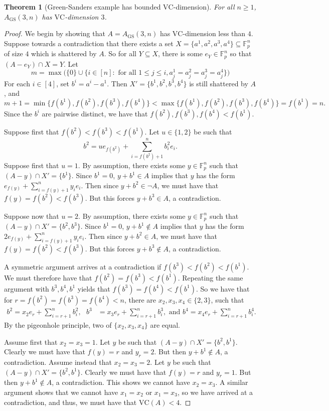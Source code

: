\documentclass[12pt,oneside,british,a4wide]{amsart}
\newtheorem{theorem}{Theorem}[section]
\numberwithin{equation}{section}
\theoremstyle{definition}
\def\F{\mathbb{F}}
\def\VC{\mathrm{VC}}
\def\GS{\mathrm{GS}}
\begin{document}
\begin{theorem}[Green-Sanders example has bounded $\VC$-dimension]\label{thm:gs3nip}
For all $n\geq 1$, $A_{\GS}(3,n)$ has $\VC$-dimension $3$.
\end{theorem}
\begin{proof}
We begin by showing that $A=A_{\GS}(3,n)$ has $\VC$-dimension less than $4$.  Suppose towards a contradiction that there exists a set $X=\{a^1,a^2,a^3,a^4\}\subseteq \F_p^n$ of size $4$ which is shattered by $A$.  So for all $Y\subseteq X$, there is some $e_Y\in \F_p^n$ so that $(A-e_Y)\cap X=Y$.  Let 
$$
m=\max\Big( \{0\}\cup \{i\in [n]: \text{ for all }1\leq j\leq i, a^1_j=a^2_j=a^3_j=a^4_j\}\Big)
$$
For each $i\in [4]$, set $b^i=a^i-a^1$.  Then $X'=\{b^1,b^2,b^3,b^4\}$ is still shattered by $A$, and 
$$m+1=\min\{f(b^1), f(b^2),f(b^3),f(b^4)\}<\max\{f(b^1), f(b^2),f(b^3),f(b^4)\}=f(b^1)=n.$$  Since the $b^i$ are pairwise distinct, we have that $f(b^2),f(b^3),f(b^4)<f(b^1)$.  

Suppose first that $f(b^2)<f(b^3)<f(b^1)$.   Let $u\in \{1,2\}$ be such that 
$$
b^2=ue_{f(b^2)}+\sum_{i=f(b^2)+1}^nb^2_ie_i.
$$
Suppose first that $u=1$.  By assumption, there exists some $y\in \F_p^n$ such that $(A-y)\cap X'=\{b^1\}$.  Since $b^1=0$, $y+b^1\in A$ implies that $y$ has the form $e_{f(y)}+\sum_{i=f(y)+1}^ny_ie_i$.  Then since $y+b^2\in \neg A$, we must have that $f(y)= f(b^2)<f(b^3)$.  But this forces $y+b^3\in A$, a contradiction.

Suppose now that $u=2$.  By assumption, there exists some $y\in \F_p^n$ such that $(A-y)\cap X'=\{b^2,b^3\}$.  Since $b^1=0$, $y+b^1\notin A$ implies that $y$ has the form $2e_{f(y)}+\sum_{i=f(y)+1}^ny_ie_i$.  Then since $y+b^2\in A$, we must have that $f(y)= f(b^2)<f(b^3)$.  But this forces $y+b^3\notin A$, a contradiction.

A symmetric argument arrives at a contradiction if $f(b^3)<f(b^2)<f(b^1)$.  We must therefore have that $f(b^2)=f(b^3)<f(b^1)$.  Repeating the same argument with $b^3,b^4,b^1$ yields that $f(b^3)=f(b^4)<f(b^1)$. So we have that for $r=f(b^2)=f(b^3)=f(b^4)<n$, there are $x_2,x_3,x_4\in \{2,3\}$, such that  
\begin{align*}
b^2=x_2e_r+\sum_{i=r+1}^nb^2_i,\text{ }b^3&=x_3e_r+\sum_{i=r+1}^nb^3_i,\text{ and }b^4=x_4e_r+\sum_{i=r+1}^nb^4_i.
\end{align*}
By the pigeonhole principle, two of $\{x_2,x_3,x_4\}$ are equal.  

Assume first that $x_2=x_3=1$.  Let $y$ be such that $(A-y)\cap X'=\{b^2,b^1\}$.  Clearly we must have that $f(y)=r$ and $y_r=2$.  But then $y+b^1\notin A$, a contradiction.  Assume instead that $x_2=x_3=2$.  Let $y$ be such that $(A-y)\cap X'=\{b^2,b^1\}$.  Clearly we must have that $f(y)=r$ and $y_r=1$.  But then $y+b^1\notin A$, a contradiction. This shows we cannot have $x_2=x_3$.  A similar argument shows that we cannot have $x_1=x_2$ or $x_1=x_3$, so we have arrived at a contradiction, and thus, we must have that $\VC(A)<4$.  


\end{proof}
\end{document}
